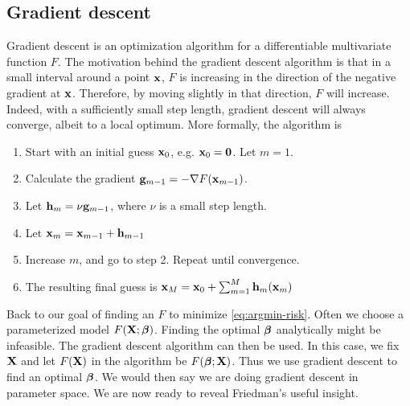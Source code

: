 \subsection{Gradient descent}
Gradient descent is an optimization algorithm for a differentiable multivariate function $F$. The motivation behind the gradient descent algorithm is that in a small interval around a point $\mathbf{x}$, $F$ is increasing in the direction of the negative gradient at $\mathbf{x}$. Therefore, by moving slightly in that direction, $F$ will increase. Indeed, with a sufficiently small step length, gradient descent will always converge, albeit to a local optimum. More formally, the algorithm is
\begin{enumerate}
    \item Start with an initial guess $\mathbf{x}_0$, e.g. $\mathbf{x}_0=\mathbf{0}$. Let $m=1$.
    \item Calculate the gradient $\mathbf{g}_{m-1}=-\nabla F(\mathbf{x}_{m-1})$.
    \item Let $\mathbf{h}_m=\nu \mathbf{g}_{m-1}$, where $\nu$ is a small step length.
    \item Let $\mathbf{x}_m=\mathbf{x}_{m-1}+\mathbf{h}_{m-1}$
    \item Increase $m$, and go to step 2. Repeat until convergence.
    \item The resulting final guess is $\mathbf{x}_M=\mathbf{x}_0+\sum_{m=1}^M\mathbf{h}_m(\mathbf{x}_m)$
\end{enumerate}
Back to our goal of finding an $F$ to minimize \eqref{eq:argmin-risk}. Often we choose a parameterized model $F(\mathbf{X};\boldsymbol{\beta})$. Finding the optimal $\boldsymbol{\beta}$ analytically might be infeasible. The gradient descent algorithm can then be used. In this case, we fix $\mathbf{X}$ and let $F(\mathbf{X})$ in the algorithm be $F(\boldsymbol{\beta};\mathbf{X})$. Thus we use gradient descent to find an optimal $\boldsymbol{\beta}$. We would then say we are doing gradient descent in parameter space. We are now ready to reveal Friedman's useful insight.

